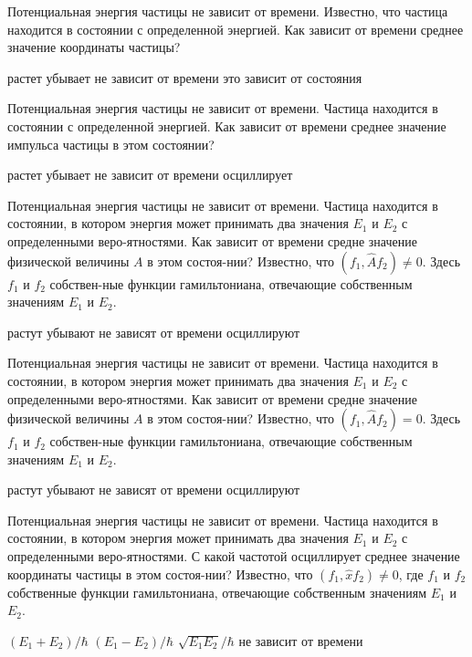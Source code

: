 \documentclass[11pt,a4paper]{exam}
\begin{document}
\begin{questions}
\question Потенциальная энергия частицы не зависит от времени. Известно, что частица находится в состоянии с определенной энергией. Как зависит от времени среднее значение координаты частицы?
\begin{choices}
\choice растет 
\choice убывает   
\choice не зависит от времени 
\choice это зависит от состояния
\end{choices}

\question Потенциальная энергия частицы не зависит от времени. Частица находится в состоянии с определенной энергией. Как зависит от времени среднее значение импульса частицы в этом состоянии?
\begin{choices}
\choice растет 
\choice убывает   
\choice не зависит от времени 
\choice осциллирует
\end{choices}

\question Потенциальная энергия частицы не зависит от времени. Частица находится в состоянии, в котором энергия может принимать два значения ${E_1}$ и ${E_2}$ с определенными веро-ятностями. Как зависит от времени средне значение физической величины $A$ в этом состоя-нии? Известно, что $\left( {{f_1},\hat A{f_2}} \right) \ne 0$. Здесь ${f_1}$ и ${f_2}$  собствен-ные функции гамильтониана, отвечающие собственным значениям ${E_1}$ и ${E_2}$.
\begin{choices}
\choice растут 
\choice убывают   
\choice не зависят от времени 
\choice осциллируют
\end{choices}

\question Потенциальная энергия частицы не зависит от времени. Частица находится в состоянии, в котором энергия может принимать два значения ${E_1}$ и ${E_2}$ с определенными веро-ятностями. Как зависит от времени средне значение физической величины $A$ в этом состоя-нии? Известно, что $\left( {{f_1},\hat A{f_2}} \right) = 0$. Здесь ${f_1}$ и ${f_2}$  собствен-ные функции гамильтониана, отвечающие собственным значениям ${E_1}$ и ${E_2}$.
\begin{choices}
\choice растут 
\choice убывают   
\choice не зависят от времени 
\choice осциллируют
\end{choices}

\question Потенциальная энергия частицы не зависит от времени. Частица находится в состоянии, в котором энергия может принимать два значения ${E_1}$ и ${E_2}$ с определенными веро-ятностями. С какой частотой осциллирует среднее значение координаты частицы в этом состоя-нии? Известно, что $\left( {{f_1},\hat x{f_2}} \right) \ne 0$, где ${f_1}$ и ${f_2}$  собственные функции гамильтониана, отвечающие собственным значениям ${E_1}$ и ${E_2}$.
\begin{choices}
\choice $\left( {{E_1} + {E_2}} \right)/\hbar $ 
\choice $\left( {{E_1} - {E_2}} \right)/\hbar $ 
\choice $\sqrt {{E_1}{E_2}} /\hbar $      
\choice не зависит от времени
\end{choices}


\end{questions}
\end{document}
